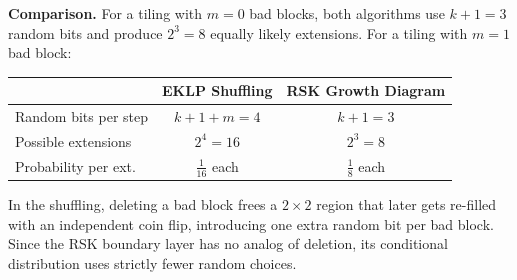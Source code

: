 \documentclass[letterpaper,11pt,oneside]{article}
\begin{document}
\begin{center}
\end{center}

\medskip

\noindent
\textbf{Comparison.}  For a tiling with $m = 0$ bad blocks, both algorithms
use $k{+}1 = 3$ random bits and produce $2^3 = 8$ equally likely extensions.
For a tiling with $m = 1$ bad block:

\begin{center}
\renewcommand{\arraystretch}{1.3}
\begin{tabular}{lcc}
  \toprule
  & \textbf{EKLP Shuffling} & \textbf{RSK Growth Diagram} \\
  \midrule
  Random bits per step & $k + 1 + m = 4$ & $k + 1 = 3$ \\
  Possible extensions  & $2^4 = 16$ & $2^3 = 8$ \\
  Probability per ext. & $\tfrac{1}{16}$ each & $\tfrac{1}{8}$ each \\
  \bottomrule
\end{tabular}
\end{center}

\smallskip

In the shuffling, deleting a bad block frees a $2\times 2$ region that later
gets re-filled with an independent coin flip, introducing one extra random
bit per bad block.  Since the RSK boundary layer has no analog of deletion,
its conditional distribution uses strictly fewer random choices.
\end{document}
